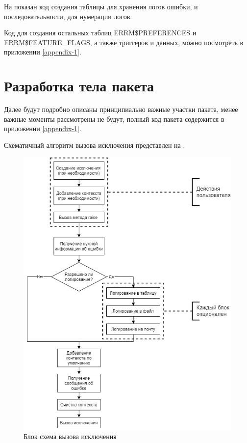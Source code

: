 На  показан код создания таблицы для хранения логов ошибки, и последовательности, для нумерации логов.

Код для создания остальных таблиц ERRM\$PREFERENCES и ERRM\$FEATURE\_FLAGS, а также триггеров и данных, можно посмотреть в приложении \ref{appendix-1}. 


\section{Разработка тела пакета} \label{ch3:sec7}

Далее будут подробно описаны принципиально важные участки пакета, менее важные моменты рассмотрены не будут, полный код пакета содержится в приложении \ref{appendix-1}.

Схематичный алгоритм вызова исключения представлен на . 

\begin{figure}[ht!] 
	\center
	\includegraphics [scale=1] {my_folder/img/c3_block_schema.png}
	\caption{Блок схема вызова исключения} 
	\label{fig:c3_block_diagram}  
\end{figure}
\FloatBarrier


